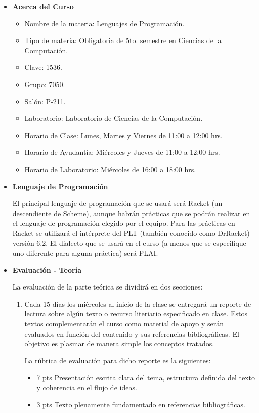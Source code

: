 \documentclass[10pt]{article}
\begin{document}
\begin{itemize}
\item \textbf{Acerca del Curso}
  
  \begin{itemize}
  \item  Nombre de la materia: Lenguajes de Programación.
  \item Tipo de materia: Obligatoria de 5to. semestre en Ciencias de
    la Computación.
  \item Clave: 1536.
  \item Grupo: 7050.
  \item Salón: P-211.
  \item Laboratorio: Laboratorio de Ciencias de la Computación.
  \item Horario de Clase: Lunes, Martes y Viernes de 11:00 a 12:00 hrs.
  \item Horario de Ayudantía: Miércoles y Jueves de 11:00 a 12:00 hrs.
  \item Horario de Laboratorio: Miércoles de 16:00 a 18:00 hrs.
  \end{itemize}

\item \textbf{Lenguaje de Programación}

El principal lenguaje de programación que se usará será Racket (un
descendiente de Scheme), aunque habrán prácticas que se podrán realizar en el lenguaje
de programación elegido por el equipo. Para las prácticas en Racket se utilizará el
intérprete del PLT (también conocido como DrRacket) versión 6.2. El dialecto que se
usará en el curso (a menos que se especifique uno diferente para alguna práctica)
será PLAI.

\item \textbf{Evaluación - Teoría}
  
  La evaluación de la parte teórica se dividirá en dos secciones:

  \begin{enumerate}
  \item Cada 15 días los miércoles al inicio de la clase se entregará un reporte de lectura sobre algún texto o recurso literiario especificado en clase. Estos textos complementarán el curso como material de apoyo y serán evaluados en función del contenido y sus referencias bibliográficas. El objetivo es plasmar de manera simple los conceptos tratados.

    La rúbrica de evaluación para dicho reporte es la siguientes:

    \begin{itemize}
    \item 7 pts Presentación escrita clara del tema, estructura definida del texto y coherencia en el flujo de ideas.
    \item 3 pts Texto plenamente fundamentado en referencias bibliográficas. 
    \end{itemize}


\end{enumerate}
\end{itemize}
\end{document}
